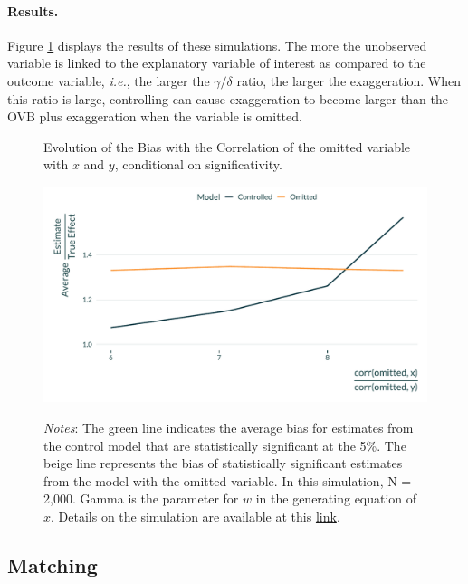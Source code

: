 \documentclass[usletter, 12pt]{article}
\begin{document}
			\paragraph{Results.}  Figure \ref{graph_controls} displays the results of these simulations. The more the unobserved variable is linked to the explanatory variable of interest as compared to the outcome variable, \textit{i.e.}, the larger the $\gamma/\delta$ ratio, the larger the exaggeration. When this ratio is large, controlling can cause exaggeration to become larger than the OVB plus exaggeration when the variable is omitted.
        
       			 \begin{figure}[!h] 
				\begin{center}
					\caption{Evolution of the Bias with the Correlation of the omitted variable with $x$ and $y$, conditional on significativity.}
					\label{graph_controls}
					\includegraphics[width=0.8\linewidth]{images/main_graph_controls_paper.pdf}
		      			\caption*{\footnotesize \textit{Notes}: The green line indicates the average bias for estimates from the control model that are statistically significant at the 5\%. The beige line represents the bias of statistically significant estimates from the model with the omitted variable. In this simulation, N = 2,000. Gamma is the parameter for $w$ in the generating equation of $x$. Details on the simulation are available at this \href{https://vincentbagilet.github.io/causal_inflation/controls.html}{link}.}
				\end{center}
				\vspace{-1cm}
			\end{figure} 
		
	
 \subsection{Matching}
		
\end{document}
